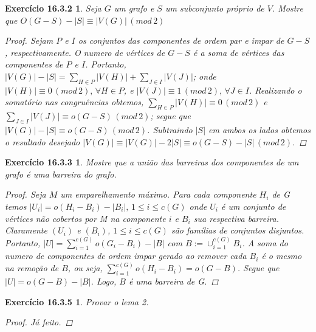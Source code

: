 \documentclass[a4paper,12pt]{article}
\newtheorem*{9}{Exercício 16.3.2}
\newtheorem*{10}{Exercício 16.3.3}
\newtheorem*{11}{Exercício 16.3.5}
\begin{document}
\begin{9}

Seja $G$ um grafo e $S$ um subconjunto próprio de $V$. Mostre que $O(G-S) - |S| \equiv |V(G)|\,(mod\,2)$

\begin{proof}

Sejam $P$ e $I$ os conjuntos das componentes de ordem par e impar de $G-S$, respectivamente. O numero de vértices de $G-S$ é a soma de vértices das componentes de $P$ e $I$. Portanto, $|V(G)| - |S| = \sum_{H \in P} |V(H)| + \sum_{J \in I} |V(J)|$; onde $|V(H)| \equiv 0\,(mod\,2),\, \forall H \in P$, e $|V(J)| \equiv 1\,(mod\,2),\, \forall J \in I$. Realizando o somatório nas congruências obtemos, $\sum_{H \in P} |V(H)| \equiv 0\,(mod\,2)$ e $\sum_{J \in I} |V(J)| \equiv o(G-S)\,(mod\,2)$; segue que $|V(G)| - |S| \equiv o(G-S)\,(mod\,2)$. Subtraindo $|S|$ em ambos os lados obtemos o resultado desejado $|V(G)| \equiv |V(G)| - 2|S| \equiv o(G-S) - |S|\,(mod\,2)$.

\end{proof}


\end{9}

\begin{10}

Mostre que a união das barreiras dos componentes de um grafo é uma barreira do grafo.

\begin{proof}

Seja $M$ um emparelhamento máximo. Para cada componente $H_i$ de G temos $|U_i| = o(H_i - B_i) - |B_i|,\, 1 \leq i \leq c(G)$ onde $U_i$ é um conjunto de vértices não cobertos por M na componente $i$ e $B_i$ sua respectiva barreira. Claramente $(U_i)$ e $(B_i)$, $1 \leq i \leq c(G)$ são famílias de conjuntos disjuntos. Portanto, $|U| = \sum_{i=1}^{c(G)} o(G_i - B_i) - |B|$ com $B := \cup_{i=1}^{c(G)} B_i$. A soma do numero de componentes de ordem impar gerado ao remover cada $B_i$ é o mesmo na remoção de $B$, ou seja, $\sum_{i=1}^{c(G)} o(H_i - B_i) = o(G-B)$. Segue que $|U| = o(G-B) - |B|$. Logo, $B$ é uma barreira de G. 
 
\end{proof}

\end{10}

\begin{11}

Provar o lema 2.

\begin{proof}

Já feito.

\end{proof}

\end{11}
\end{document}
